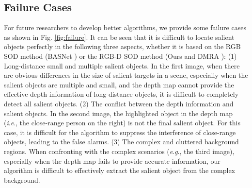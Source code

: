 \documentclass[journal]{IEEEtran}
\newcommand{\ie}{\textit{i}.\textit{e}.}
\newcommand{\eg}{\textit{e}.\textit{g}.}
\begin{document}
\subsection{Failure Cases}
For future researchers to develop better algorithms, we provide some failure cases as shown in Fig. \ref{fig:failure}. It can be seen that it is difficult to locate salient objects perfectly in the following three aspects, whether it is based on the RGB SOD method (BASNet \cite{Qin_2019_CVPR}) or the RGB-D SOD method (Ours and DMRA \cite{Piao_2019_ICCV}): (1) Long-distance small and multiple salient objects. In the first image, when there are obvious differences in the size of salient targets in a scene, especially when the salient objects are multiple and small, and the depth map cannot provide the effective depth information of long-distance objects, it is difficult to completely detect all salient objects. (2) The conflict between the depth information and salient objects. In the second image, the highlighted object in the depth map (\ie, the close-range person on the right) is not the final salient object. For this case, it is difficult for the algorithm to suppress the interference of close-range objects, leading to the false alarms. (3) The complex and cluttered background regions. When confronting with the complex scenarios (\eg, the third image), especially when the depth map fails to provide accurate information, our algorithm is difficult to effectively extract the salient object from the complex background.
\end{document}
